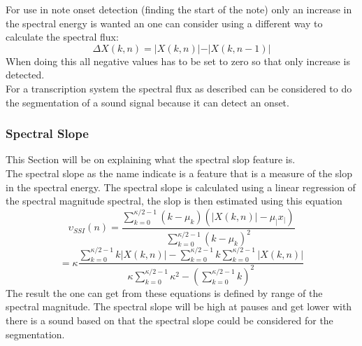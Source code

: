 For use in note onset detection (finding the start of the note) only an increase in the spectral energy is wanted an one can consider using a different way to calculate the spectral flux\citep{ACA}:
\begin{equation}
	\Delta X(k,n) = \vert X(k,n)\vert-\vert X(k,n-1)\vert
\end{equation}
When doing this all negative values has to be set to zero so that only increase is detected\citep{ACA}.
\\
For a transcription system the spectral flux as described can be considered to do the segmentation of a sound signal because it can detect an onset.
 
\subsubsection{Spectral Slope}
This Section will be on explaining what the spectral slop feature is.\\
The spectral slope as the name indicate is a feature that is a measure of the slop in the spectral energy\citep{ACA}. The spectral slope is calculated using a linear regression of the spectral magnitude spectral, the slop is then estimated using this equation\citep{ACA}
\begin{equation}
	\upsilon _{SSI} (n) = \frac{\displaystyle\sum_{k = 0}^{\kappa/2-1}(k - \mu_k)(\vert X(k,n)\vert - \mu_\vert x _\vert)}{\displaystyle\sum_{k = 0}^{\kappa/2-1}(k - \mu_k)^2}
\end{equation}
\begin{equation}
	= \kappa\frac{\displaystyle\sum_{k= 0}^{\kappa/2-1}k\vert X(k,n)\vert - \displaystyle\sum_{k = 0}^{\kappa/2-1}k\displaystyle\sum_{k = 0}^{\kappa/2-1}\vert X(k,n)\vert}{\kappa \displaystyle\sum_{k = 0}^{\kappa/2-1}\kappa^2-(\displaystyle\sum_{k = 0}^{\kappa/2-1}k)^2}
\end{equation}
The result the one can get from these equations is defined by range of the spectral magnitude.
The spectral slope will be high at pauses and get lower with there is a sound based on that the spectral slope could be considered for the segmentation.